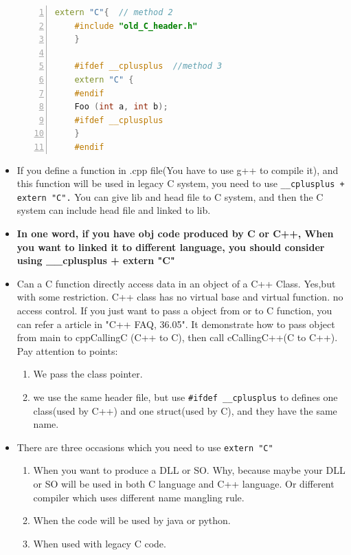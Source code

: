 \documentclass[a4paper,11pt,twoside]{book}
\begin{document}
\begin{itemize}
\begin{lstlisting}[frame=single, language=c++, numbers=left,
	stepnumber=1, xleftmargin=2em, framexleftmargin=1.9em]
	extern "C"{  // method 2
	#include "old_C_header.h"
	}
	
	#ifdef __cplusplus  //method 3
	extern "C" {
	#endif
	Foo (int a, int b);
	#ifdef __cplusplus
	}
	#endif
	\end{lstlisting}
	
	\item If you define a function in .cpp file(You have to use g++ to compile it), and this function will be used in legacy C system, you need to use \texttt{\_\_cplusplus + extern "C".}  You can give lib and head file to C system,  and then the C system can include head file and linked to lib.
	
	\item \textbf{In one word, if you have obj code produced by C or C++, When you want to linked it to different language, you should consider using \_\_cplusplus + extern "C" }
	
	\item Can a C function directly access data in an object of a C++ Class. Yes,but with some restriction. C++ class has no virtual base and virtual function. no access control. If you just want to pass a object from or to C function, you can refer a article in "C++ FAQ, 36.05". It demonstrate how to pass object from main to cppCallingC (C++ to C), then call cCallingC++(C to C++). Pay attention to points:
	\begin{enumerate}
		\item We pass the class pointer.
		\item we use the same header file, but use \texttt{\#ifdef \_\_cplusplus} to defines one class(used by C++) and one struct(used by C), and they have the same name.
	\end{enumerate}
	
	\item There are three occasions which you need to use \texttt{extern "C"}
	\begin{enumerate}
		\item When you want to produce a DLL or SO. Why, because maybe your DLL or SO will be used in both C language and C++ language. Or different compiler which uses different name mangling rule.
		
		\item When the code will be used by java or python.
		
		\item When used with legacy C code.
	\end{enumerate}
\end{itemize}
\end{document}
